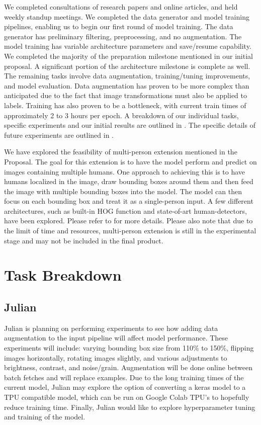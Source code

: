 \documentclass[11pt, letterpaper]{article}
\begin{document}
We completed consultations of research papers and online articles, and held weekly standup meetings. We completed the data generator and model training pipelines, enabling us to begin our first round of model training. The data generator has preliminary filtering, preprocessing, and no augmentation. The model training has variable architecture parameters and save/resume capability. We completed the majority of the preparation milestone mentioned in our initial proposal. A significant portion of the architecture milestone is complete as well. The remaining tasks involve data augmentation, training/tuning improvements, and model evaluation. Data augmentation has proven to be more complex than anticipated due to the fact that image transformations must also be applied to labels. Training has also proven to be a bottleneck, with current train times of approximately 2 to 3 hours per epoch. A breakdown of our individual tasks, specific experiments and our initial results are outlined in . The specific details of future experiments are outlined in . 

We have explored the feasibility of multi-person extension mentioned in the Proposal. The goal for this extension is to have the model perform and predict on images containing multiple humans. One approach to achieving this is to have humans localized in the image, draw bounding boxes around them and then feed the image with multiple bounding boxes into the model. The model can then focus on each bounding box and treat it as a single-person input. A few different architectures, such as built-in HOG function and state-of-art human-detectors, have been explored. Please refer to  for more details. Please also note that due to the limit of time and resources, multi-person extension is still in the experimental stage and may not be included in the final product.   


\section{Task Breakdown}
\label{SectionTaskB}
\subsection{Julian}
Julian is planning on performing experiments to see how adding data augmentation to the input pipeline will affect model performance. These experiments will include: varying bounding box size from 110\% to 150\%, flipping images horizontally, rotating images slightly, and various adjustments to brightness, contrast, and noise/grain. Augmentation will be done online between batch fetches and will replace examples. Due to the long training times of the current model, Julian may explore the option of converting a keras model to a TPU compatible model, which can be run on Google Colab TPU’s to hopefully reduce training time. Finally, Julian would like to explore hyperparameter tuning and training of the model.
\end{document}
